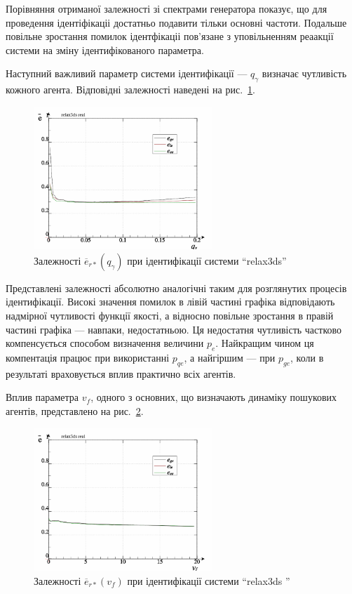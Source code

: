 Порівняння отриманої залежності зі спектрами генератора
показує, що для проведення ідентіфікаціі достатньо подавити
тільки основні частоти. Подальше повільне зростання помилок
ідентфікаціі пов'язане з уповільненням реаакції системи на
зміну ідентифікованого параметра.

Наступний важливий параметр системи ідентифікації ---
$ q_\gamma $ визначає чутливість кожного агента. Відповідні
залежності наведені на рис.~\ref{atu:f:relax3ds_read_id2_prm_0-p_q_gamma}.


\begin{figure}[htb!]
  \centerline{\includegraphics[width=0.6\textwidth]{p/relax3ds_read_id2_prm_0-p_q_gamma.png} }
  \caption{Залежності $ \overline{e}_{r *} (q_\gamma) $ при ідентифікації системи ``relax3ds''}
  \label{atu:f:relax3ds_read_id2_prm_0-p_q_gamma}
\end{figure}

Представлені залежності абсолютно аналогічні таким для
розглянутих процесів ідентифікації. Високі значення помилок
в лівій частині графіка відповідають надмірної чутливості
функції якості, а відносно повільне зростання в правій
частині графіка --- навпаки, недостатньою. Ця недостатня
чутливість частково компенсується способом визначення величини
$ p_e $. Найкращим чином ця компентація працює при використанні
$ p_{qe} $, а найгіршим --- при
$ p_{ge} $, коли в результаті враховується вплив практично всіх
агентів.

Вплив параметра
$ v_f $, одного з основних, що визначають динаміку пошукових
агентів, представлено на рис.~\ref{atu:f:relax3ds_read_id2_prm_0-p_v_f}.

\begin{figure}[htb!]
  \centerline{\includegraphics[width=0.6\textwidth]{p/relax3ds_read_id2_prm_0-p_v_f.png} }
  \caption{Залежності $ \overline{e}_{r *} (v_f) $ при ідентифікації системи ``relax3ds ''}
  \label{atu:f:relax3ds_read_id2_prm_0-p_v_f}
\end{figure}

